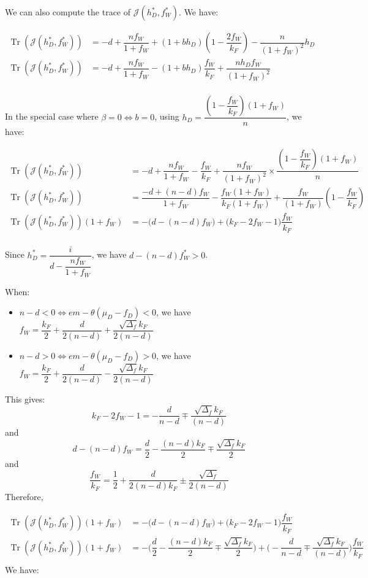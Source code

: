 \documentclass{article}
\DeclareMathOperator{\Tr}{Tr}
\begin{document}
We can also compute the trace of $\mathcal{J}(h_D^*, f_W^*)$. We have:

\begin{align*}
\Tr(\mathcal{J}(h_D^*, f_W^*)) &= - d + \dfrac{nf_W}{1+f_W} + (1+bh_D)(1 - \dfrac{2f_W}{k_F}) - \dfrac{n}{(1 + f_W)^2}h_D \\
\Tr(\mathcal{J}(h_D^*, f_W^*)) &= - d + \dfrac{nf_W}{1+f_W} -(1+b h_D) \dfrac{f_W}{k_F} + \dfrac{n h_D f_W}{(1+f_W)^2}\\
\end{align*}

In the special case where $\beta = 0 \Leftrightarrow b = 0$, using $h_D =  \dfrac{(1 - \dfrac{f_W}{k_F})(1+ f_W)}{n}$, we have:

\begin{align*}
\Tr(\mathcal{J}(h_D^*, f_W^*)) &= - d + \dfrac{nf_W}{1+f_W} - \dfrac{f_W}{k_F} + \dfrac{n f_W}{(1+f_W)^2} \times\dfrac{(1 - \dfrac{f_W}{k_F})(1+ f_W)}{n} \\
\Tr(\mathcal{J}(h_D^*, f_W^*)) &= \dfrac{-d + (n-d)f_W}{1+f_W} - \dfrac{f_W(1+f_W)}{k_F(1+f_W)} + \dfrac{f_W}{(1+f_W)}(1 - \dfrac{f_W}{k_F}) \\
\Tr(\mathcal{J}(h_D^*, f_W^*))(1+f_W) &= -\Big(d - (n-d)f_W\Big) + \Big( k_F - 2f_W - 1\Big)\dfrac{f_W}{k_F} \\
\end{align*}

Since $h_D^* = \dfrac{i}{d - \dfrac{n f_W}{1 + f_W}}$, we have $d - (n - d)f_W^* > 0$.

When:

\begin{itemize}
\item $n-d < 0 \Leftrightarrow em - \theta(\mu_D - f_D) < 0$, we have $f_W = \dfrac{k_F}{2} + \dfrac{d}{2(n-d)} + \dfrac{\sqrt{\Delta_f} k_F}{2(n-d)}$
\item $n-d > 0 \Leftrightarrow em - \theta(\mu_D - f_D) > 0$, we have $f_W = \dfrac{k_F}{2} + \dfrac{d}{2(n-d)} - \dfrac{\sqrt{\Delta_f} k_F}{2(n-d)}$
\end{itemize}

This gives:
$$
k_F - 2f_W - 1 = -\dfrac{d}{n-d} \mp \dfrac{\sqrt{\Delta_f} k_F}{(n-d)}
$$
and
$$
d - (n-d)f_W =  \dfrac{d}{2} - \dfrac{(n-d)k_F}{2} \mp \dfrac{\sqrt{\Delta_f} k_F}{2}
$$ and
$$
\dfrac{f_W}{k_F} = \dfrac{1}{2} + \dfrac{d}{2(n-d)k_F} \pm \dfrac{\sqrt{\Delta_f}}{2(n-d)}
$$
Therefore,

\begin{align*}
\Tr(\mathcal{J}(h_D^*, f_W^*))(1+f_W) &= -\Big(d - (n-d)f_W\Big) + \Big( k_F - 2f_W - 1\Big)\dfrac{f_W}{k_F} \\
\Tr(\mathcal{J}(h_D^*, f_W^*))(1+f_W) &= -\Big(\dfrac{d}{2} - \dfrac{(n-d)k_F}{2} \mp \dfrac{\sqrt{\Delta_f} k_F}{2}\Big) + \Big( -\dfrac{d}{n-d} \mp \dfrac{\sqrt{\Delta_f} k_F}{(n-d)}\Big)\dfrac{f_W}{k_F} \\
\end{align*}
We have:
\end{document}

